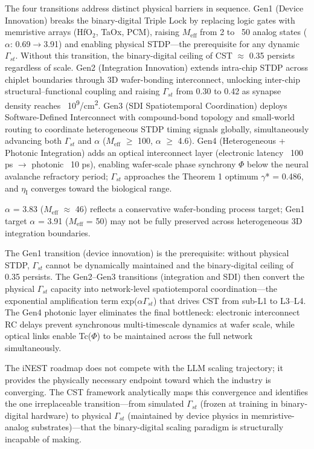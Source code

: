 \documentclass[a4paper,12pt]{article}
\providecommand{\textsubscript}[1]{\ensuremath{_{\text{#1}}}}
\begin{document}
The four transitions address distinct physical barriers in sequence.
Gen1 (Device Innovation) breaks the binary-digital Triple Lock by replacing logic gates with memristive arrays (HfO\textsubscript{2}, TaOx, PCM), raising $M_{\text{eff}}$ from 2 to ~50 analog states ($\alpha$: 0.69$\rightarrow$3.91) and enabling physical STDP---the prerequisite for any dynamic $\Gamma_{st}$.
Without this transition, the binary-digital ceiling of CST $\approx$ 0.35 persists regardless of scale.
Gen2 (Integration Innovation) extends intra-chip STDP across chiplet boundaries through 3D wafer-bonding interconnect, unlocking inter-chip structural--functional coupling and raising $\Gamma_{st}$ from 0.30 to 0.42 as synapse density reaches ~10\textsuperscript{9}/cm\textsuperscript{2}.
Gen3 (SDI Spatiotemporal Coordination) deploys Software-Defined Interconnect with compound-bond topology and small-world routing to coordinate heterogeneous STDP timing signals globally, simultaneously advancing both $\Gamma_{st}$ and $\alpha$ ($M_{\text{eff}}$ $\geq$ 100, $\alpha$ $\geq$ 4.6).
Gen4 (Heterogeneous + Photonic Integration) adds an optical interconnect layer (electronic latency ~100 ps $\rightarrow$ photonic ~10 ps), enabling wafer-scale phase synchrony $\Phi$ below the neural avalanche refractory period; $\Gamma_{st}$ approaches the Theorem 1 optimum $\gamma$* = 0.486, and $\eta_{\text{I}}$ converges toward the biological range.


 $\alpha$ = 3.83 ($M_{\text{eff}}$ $\approx$ 46) reflects a conservative wafer-bonding process target; Gen1 target $\alpha$ = 3.91 ($M_{\text{eff}}$ = 50) may not be fully preserved across heterogeneous 3D integration boundaries.


The Gen1 transition (device innovation) is the prerequisite: without physical STDP, $\Gamma_{st}$ cannot be dynamically maintained and the binary-digital ceiling of 0.35 persists.
The Gen2--Gen3 transitions (integration and SDI) then convert the physical $\Gamma_{st}$ capacity into network-level spatiotemporal coordination---the exponential amplification term exp($\alpha$\cdot$\Gamma_{st}$) that drives CST from sub-L1 to L3--L4.
The Gen4 photonic layer eliminates the final bottleneck: electronic interconnect RC delays prevent synchronous multi-timescale dynamics at wafer scale, while optical links enable Tc($\Phi$) to be maintained across the full network simultaneously.


The iNEST roadmap does not compete with the LLM scaling trajectory; it provides the physically necessary endpoint toward which the industry is converging.
The CST framework analytically maps this convergence and identifies the one irreplaceable transition---from simulated $\Gamma_{st}$ (frozen at training in binary-digital hardware) to physical $\Gamma_{st}$ (maintained by device physics in memristive-analog substrates)---that the binary-digital scaling paradigm is structurally incapable of making.
\end{document}
